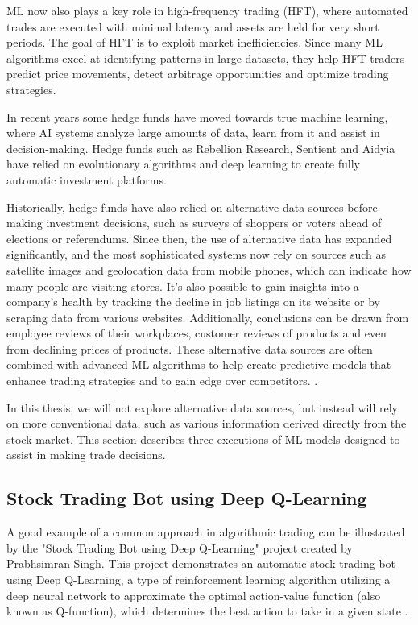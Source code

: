 \documentclass[a4paper,oneside,onecolumn,12pt]{book}
\begin{document}
	ML now also plays a key role in high-frequency trading (HFT), where automated trades are executed with minimal latency and assets are held for very short periods. The goal of HFT is to exploit market inefficiencies. Since many ML algorithms excel at identifying patterns in large datasets, they help HFT traders predict price movements, detect arbitrage opportunities and optimize trading strategies.

	In recent years some hedge funds have moved towards true machine learning, where AI systems analyze large amounts of data, learn from it and assist in decision-making. Hedge funds such as Rebellion Research, Sentient and Aidyia have relied on evolutionary algorithms and deep learning to create fully automatic investment platforms.

	Historically, hedge funds have also relied on alternative data sources before making investment decisions, such as surveys of shoppers or voters ahead of elections or referendums. Since then, the use of alternative data has expanded significantly, and the most sophisticated systems now rely on sources such as satellite images and geolocation data from mobile phones, which can indicate how many people are visiting stores. It's also possible to gain insights into a company's health by tracking the decline in job listings on its website or by scraping data from various websites. Additionally, conclusions can be drawn from employee reviews of their workplaces, customer reviews of products and even from declining prices of products. These alternative data sources are often combined with advanced ML algorithms to help create predictive models that enhance trading strategies and to gain edge over competitors. \cite{MLAT}.

	In this thesis, we will not explore alternative data sources, but instead will rely on more conventional data, such as various information derived directly from the stock market. This section describes three executions of ML models designed to assist in making trade decisions.

	\subsection{Stock Trading Bot using Deep Q-Learning \cite{STBDQ}}
	A good example of a common approach in algorithmic trading can be illustrated by the "Stock Trading Bot using Deep Q-Learning" project created by Prabhsimran Singh. This project demonstrates an automatic stock trading bot using Deep Q-Learning, a type of reinforcement learning algorithm utilizing a deep neural network to approximate the optimal action-value function (also known as Q-function), which determines the best action to take in a given state \cite{HCTDRL}.
\end{document}
